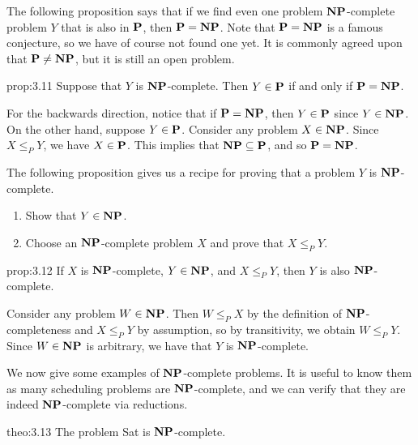 The following proposition says that if we find even one problem $\operatorname{\textbf{NP}}$-complete 
problem $Y$ that is also in $\operatorname{\textbf{P}}$, then $\operatorname{\textbf{P}} = \operatorname{\textbf{NP}}$. Note that $\operatorname{\textbf{P}} = \operatorname{\textbf{NP}}$ 
is a famous conjecture, so we have of course not found one yet. It is commonly 
agreed upon that $\operatorname{\textbf{P}} \neq \operatorname{\textbf{NP}}$, but it is still an open problem.

\begin{prop}{prop:3.11}
    Suppose that $Y$ is $\operatorname{\textbf{NP}}$-complete. Then $Y \in \operatorname{\textbf{P}}$ if and only if 
    $\operatorname{\textbf{P}} = \operatorname{\textbf{NP}}$. 
\end{prop}
\begin{pf}
    For the backwards direction, notice that if $\operatorname{\textbf{P}} = \operatorname{\textbf{NP}}$, then 
    $Y \in \operatorname{\textbf{P}}$ since $Y \in \operatorname{\textbf{NP}}$. On the other hand, suppose $Y \in \operatorname{\textbf{P}}$. 
    Consider any problem $X \in \operatorname{\textbf{NP}}$. Since $X \leq_P Y$, we have $X \in \operatorname{\textbf{P}}$. 
    This implies that $\operatorname{\textbf{NP}} \subseteq \operatorname{\textbf{P}}$, and so $\operatorname{\textbf{P}} = \operatorname{\textbf{NP}}$. 
\end{pf}

The following proposition gives us a recipe for proving that a problem $Y$ 
is $\operatorname{\textbf{NP}}$-complete. 
\begin{enumerate}
    \item Show that $Y \in \operatorname{\textbf{NP}}$. 
    \item Choose an $\operatorname{\textbf{NP}}$-complete problem $X$ and prove that $X \leq_P Y$. 
\end{enumerate}

\begin{prop}{prop:3.12}
    If $X$ is $\operatorname{\textbf{NP}}$-complete, $Y \in \operatorname{\textbf{NP}}$, and $X \leq_P Y$, then 
    $Y$ is also $\operatorname{\textbf{NP}}$-complete. 
\end{prop}
\begin{pf}
    Consider any problem $W \in \operatorname{\textbf{NP}}$. Then $W \leq_P X$ by the definition 
    of $\operatorname{\textbf{NP}}$-completeness and $X \leq_P Y$ by assumption, so by transitivity, 
    we obtain $W \leq_P Y$. Since $W \in \operatorname{\textbf{NP}}$ is arbitrary, we have 
    that $Y$ is $\operatorname{\textbf{NP}}$-complete. 
\end{pf}

We now give some examples of $\operatorname{\textbf{NP}}$-complete problems. It is useful to know 
them as many scheduling problems are $\operatorname{\textbf{NP}}$-complete, and we can verify 
that they are indeed $\operatorname{\textbf{NP}}$-complete via reductions. 

\begin{theo}{theo:3.13}
    The problem {\sc Sat} is $\operatorname{\textbf{NP}}$-complete. 
\end{theo}

